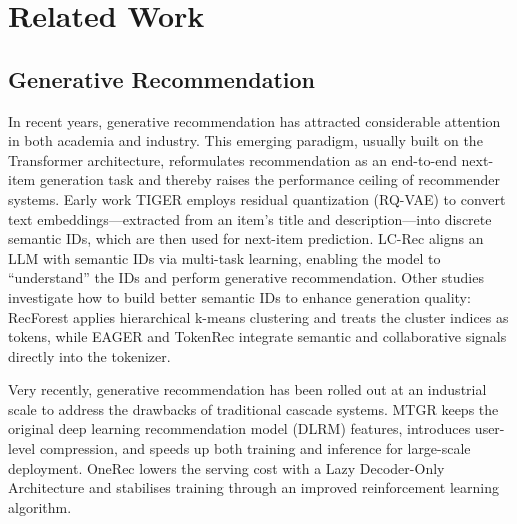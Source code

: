 \section{Related Work}
\subsection{Generative Recommendation}

In recent years, generative recommendation has attracted considerable attention in both academia and industry. This emerging paradigm, usually built on the Transformer architecture, reformulates recommendation as an end-to-end next-item generation task and thereby raises the performance ceiling of recommender systems.
Early work TIGER \citep{TIGER} employs residual quantization (RQ-VAE) \citep{rqvae} to convert text embeddings—extracted from an item’s title and description—into discrete semantic IDs, which are then used for next-item prediction. LC-Rec \citep{LCRec} aligns an LLM with semantic IDs via multi-task learning, enabling the model to “understand” the IDs and perform generative recommendation. Other studies investigate how to build better semantic IDs to enhance generation quality: RecForest \citep{recforest} applies hierarchical k-means clustering and treats the cluster indices as tokens, while EAGER \citep{eagar} and TokenRec \citep{TOKENRec} integrate semantic and collaborative signals directly into the tokenizer.

Very recently, generative recommendation has been rolled out at an industrial scale to address the drawbacks of traditional cascade systems. MTGR \citep{mtgr} keeps the original deep learning recommendation model (DLRM) features, introduces user-level compression, and speeds up both training and inference for large-scale deployment. OneRec \citep{OneRec} lowers the serving cost with a Lazy Decoder-Only Architecture and stabilises training through an improved reinforcement learning algorithm.

